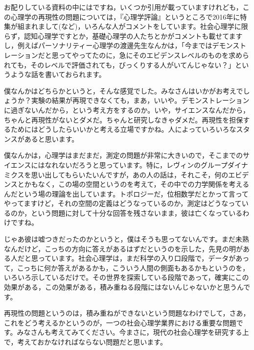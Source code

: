 \documentclass{ltjsbook}
\begin{document}
お配りしている資料の中にはですね，いくつか引用が載っていますけれども，この心理学の再現性の問題については，『心理学評論』というところで2016年に特集が組まれまして(\textcite{Ikeda2016}など)，いろんな人がコメントをしています。社会心理学に限らず，認知心理学ですとか，基礎心理学の人たちとかがコメントも載せてますし，例えばパーソナリティー心理学の渡邊先生なんかは，「今まではデモンストレーションだと思ってやってたのに，急にそのエビデンスレベルのものを求められても，そのレベルで評価されても，びっくりする人がいてんじゃない？」というような話を書いておられます\parencite{Watanabe2016}。

僕なんかはどちらかというと，そんな感覚でした。みなさんはいかがお考えでしょうか？実験の結果が再現できなくても，まあ，いいや。デモンストレーションに過ぎないんだから，という考え方をするのか。いや，サイエンスなんだから，ちゃんと再現性がないとダメだ。ちゃんと研究しなきゃダメだ。再現性を担保するためにはどうしたらいいかと考える立場ですかね。人によっていろいろなスタンスがあると思います。

僕なんかは，心理学はまだまだ，測定の問題が非常に大きいので，そこまでのサイエンスにはなれないだろうと思っています。特に，レヴィンのグループダイナミクスを思い出してもらいたいんですが，あの人の話は，それこそ，何のエビデンスとかもなく，この場の空間というのを考えて，その中での力学関係を考えるんだという場の理論を出しています。トポロジーだ，位相数学だとかって言ってやってますけど，それの空間の定義はどうなっているのか，測定はどうなっているのか，という問題に対して十分な回答を残さないまま，彼は亡くなっているわけですね。


じゃあ彼は嘘つきだったのかというと，僕はそうも思ってないんです。まだ未熟なんだけど，こっちの方向に答えがあるはずだというのを示した，先見の明がある人だと思っています。社会心理学は，まだ科学の入り口段階で，データがあって，こっちに何か答えがあるかも，こういう人間の側面もあるかもというのを，いろいろ示しているだけで。その世界を探索している段階であって，確実にこの効果がある，この効果がある，積み重ねる段階にはないんじゃないかと思うんです。

再現性の問題というのは，積み重ねができないという問題なわけでして，さあ，これをどう考えるかというのが，一つの社会心理学業界における重要な問題です。みなさんも考えてみてください。今まさに，現代の社会心理学を研究する上で，考えておかなければならない問題だと思います。
\end{document}
